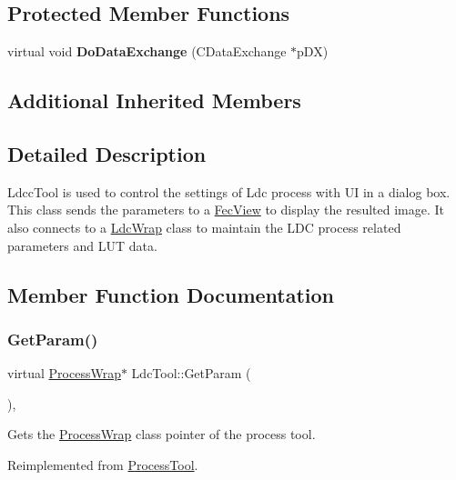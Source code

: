 \subsection*{Protected Member Functions}
\begin{DoxyCompactItemize}
\item 
\mbox{\label{class_ldc_tool_a339d49ce8a034e52ed1dcfaf2a50b2d2}} 
virtual void {\bfseries Do\+Data\+Exchange} (C\+Data\+Exchange $\ast$p\+DX)
\end{DoxyCompactItemize}
\subsection*{Additional Inherited Members}


\subsection{Detailed Description}
Ldcc\+Tool is used to control the settings of Ldc process with UI in a dialog box. This class sends the parameters to a \mbox{\hyperlink{class_fec_view}{Fec\+View}} to display the resulted image. It also connects to a \mbox{\hyperlink{class_ldc_wrap}{Ldc\+Wrap}} class to maintain the L\+DC process related parameters and L\+UT data. 

\subsection{Member Function Documentation}
\mbox{\label{class_ldc_tool_af9828a2daf501b328a07dd8fa3d6abeb}} 
\subsubsection{\texorpdfstring{Get\+Param()}{GetParam()}}
{\footnotesize\ttfamily virtual \mbox{\hyperlink{class_process_wrap}{Process\+Wrap}}$\ast$ Ldc\+Tool\+::\+Get\+Param (\begin{DoxyParamCaption}{ }\end{DoxyParamCaption})\hspace{0.3cm}{\ttfamily [inline]}, {\ttfamily [virtual]}}

Gets the \mbox{\hyperlink{class_process_wrap}{Process\+Wrap}} class pointer of the process tool. 

Reimplemented from \mbox{\hyperlink{class_process_tool_a355ebcf991f86f59f4241ea4345547fc}{Process\+Tool}}.

